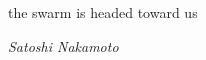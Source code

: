 \vspace*{100mm} 
\begin{displayquote}{

\large{the swarm is headed toward us}
}

\textit{Satoshi Nakamoto}
\end{displayquote}

\newpage
